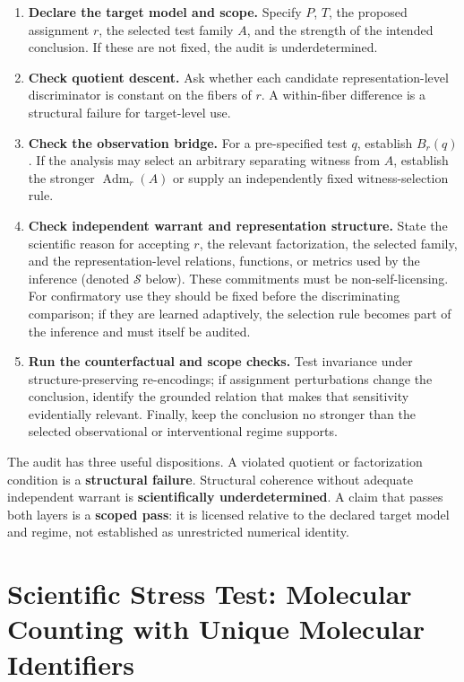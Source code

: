 \documentclass[11pt]{article}
\begin{document}
\begin{enumerate}[leftmargin=*]
\item \textbf{Declare the target model and scope.} Specify \(P\), \(T\), the proposed assignment \(r\), the selected test family \(A\), and the strength of the intended conclusion. If these are not fixed, the audit is underdetermined.
\item \textbf{Check quotient descent.} Ask whether each candidate representation-level discriminator is constant on the fibers of \(r\). A within-fiber difference is a structural failure for target-level use.
\item \textbf{Check the observation bridge.} For a pre-specified test \(q\), establish \(B_r(q)\). If the analysis may select an arbitrary separating witness from \(A\), establish the stronger \(\operatorname{Adm}_r(A)\) or supply an independently fixed witness-selection rule.
\item \textbf{Check independent warrant and representation structure.} State the scientific reason for accepting \(r\), the relevant factorization, the selected family, and the representation-level relations, functions, or metrics used by the inference (denoted \(\mathcal S\) below). These commitments must be non-self-licensing. For confirmatory use they should be fixed before the discriminating comparison; if they are learned adaptively, the selection rule becomes part of the inference and must itself be audited.
\item \textbf{Run the counterfactual and scope checks.} Test invariance under structure-preserving re-encodings; if assignment perturbations change the conclusion, identify the grounded relation that makes that sensitivity evidentially relevant. Finally, keep the conclusion no stronger than the selected observational or interventional regime supports.
\end{enumerate}

The audit has three useful dispositions. A violated quotient or factorization condition is a \textbf{structural failure}. Structural coherence without adequate independent warrant is \textbf{scientifically underdetermined}. A claim that passes both layers is a \textbf{scoped pass}: it is licensed relative to the declared target model and regime, not established as unrestricted numerical identity.

\section{Scientific Stress Test: Molecular Counting with Unique Molecular Identifiers}
\end{document}
